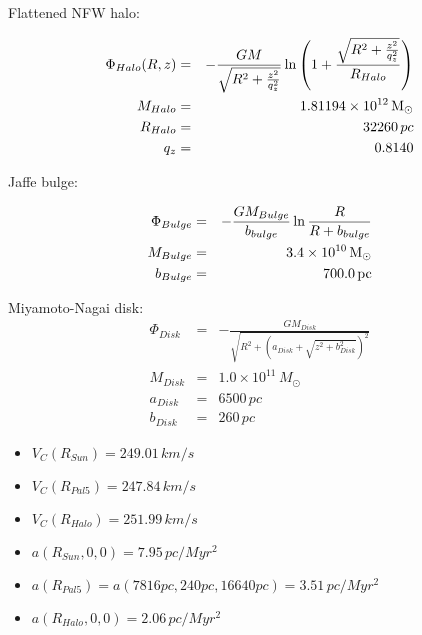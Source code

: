 Flattened NFW halo:

\begin{eqnarray}
  \Phi_{Halo}(R, z) &=& -\frac{GM}{\sqrt{R^2+\frac{z^2}{q_z^2}}}\ln\left(1+\frac{\sqrt{R^2+\frac{z^2}{q_z^2}}}{R_{Halo}} \right)\\
  M_{Halo} &=& 1.81194\times 10^{12}\mbox{$\,{\rm M}_\odot$}\\
  R_{Halo} &=& 32260\,pc\\
  q_z &=& 0.8140
\end{eqnarray}

Jaffe bulge:

\begin{eqnarray}
  \Phi_{Bulge} &=& -\frac{GM_{Bulge}}{b_{bulge}}\ln{\frac{R}{R+b_{bulge}}}\\
  M_{Bulge} &=& 3.4\times 10^{10}\mbox{$\,{\rm M}_\odot$}\\
  b_{Bulge} &=& 700.0\,\mbox{pc}
\end{eqnarray}

Miyamoto-Nagai disk:
\begin{eqnarray}
  \Phi_{Disk} &=& -\frac{GM_{Disk}}{\sqrt{R^2+\left(a_{Disk}+\sqrt{z^2+b_{Disk}^2}\right)^2}}\\
  M_{Disk} &=& 1.0\times 10^{11}\,M_{\odot}\\
  a_{Disk} &=& 6500\,pc\\
  b_{Disk} &=& 260\,pc
\end{eqnarray}

\begin{itemize}
  \item $V_C(R_{Sun}) = 249.01\,km/s$
  \item $V_C(R_{Pal5}) = 247.84\,km/s$
  \item $V_C(R_{Halo}) = 251.99\,km/s$
  \item $a(R_{Sun}, 0, 0) = 7.95\,pc/Myr^2$
  \item $a(R_{Pal5}) = a(7816 pc, 240 pc, 16640 pc) = 3.51\,pc/Myr^2$
  \item $a(R_{Halo}, 0, 0) = 2.06\,pc/Myr^2$
\end{itemize}


